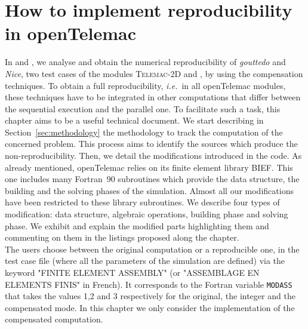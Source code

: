 \newcommand{\red}{\color{red}}
\newcommand{\ie}{{\it i.e.}~}
\newcommand{\Hilight}{\makebox[0pt][l]{\color{babypink}\rule[-2pt]{\linewidth}{10pt}}}
\chapter{How to implement reproducibility in openTelemac}
\label{ref:reprod_guide}
%
%
In \cite{LaND15} and \cite{LaND16}, we analyse and obtain the numerical reproducibility
of \textit{gouttedo} and \textit{Nice}, two test cases of the modules {{\scshape Telemac-2D}\xspace}
and \tomawac, by using the compensation techniques.
To obtain a full reproducibility, \ie in all openTelemac
modules, these techniques have
to be integrated in other computations that differ between the sequential
execution and the parallel one.
To facilitate such a task, this chapter aims to be a useful technical
document.
%
We start describing in Section~\ref{sec:methodology} the methodology to
track the computation of the concerned problem. This process
aims to identify the sources which produce the non-reproducibility.
Then, we detail the modifications introduced in the code.
As already mentioned, openTelemac relies on its finite element library BIEF.
This one includes many Fortran~90 subroutines
which provide the data structure, the building and
the solving phases of the simulation.
Almost all our modifications have been restricted
to these library subroutines.
We describe four types of modification: data structure,
algebraic operations, building phase and solving phase.
We exhibit and explain the modified parts highlighting them and commenting on them in
the listings proposed along the chapter.\\
%
%
The users choose between the original computation or a reproducible one,
in the test case file (where all the parameters of the simulation are defined)
via the keyword "FINITE ELEMENT ASSEMBLY"
(or "ASSEMBLAGE EN ELEMENTS FINIS" in French).
It corresponds to the Fortran variable \texttt{MODASS}
that takes the values 1,2 and 3 respectively for the original,
the integer and the compensated mode.
%
In this chapter we only consider the implementation of
the compensated computation.
%
